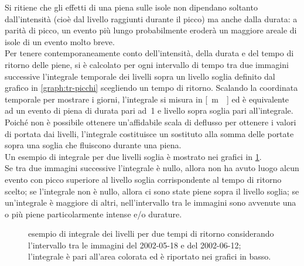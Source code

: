 Si ritiene che gli effetti di una piena sulle isole non dipendano soltanto dall'intensità (cioè dal livello raggiunti durante il picco) ma anche dalla durata: a parità di picco, un evento più lungo probabilmente eroderà un maggiore areale di isole di un evento molto breve.
\\
Per tenere contemporaneamente conto dell'intensità, della durata e del tempo di ritorno delle piene, si è calcolato per ogni intervallo di tempo tra due immagini successive l'integrale temporale dei livelli sopra un livello soglia definito dal grafico in \cref{graph:tr-picchi} scegliendo un tempo di ritorno.
Scalando la coordinata temporale per mostrare i giorni, l'integrale si misura in \si{[\m\giorno]} ed è equivalente ad un evento di piena di durata pari ad~\SI{1}{\giorno} e livello sopra soglia pari all'integrale.
Poiché non è possibile ottenere un'affidabile scala di deflusso per ottenere i valori di portata dai livelli, l'integrale costituisce un sostituto alla somma delle portate sopra una soglia che fluiscono durante una piena.
\\
Un esempio di integrale per due livelli soglia è mostrato nei grafici in \cref{graph:esempio-integrale-livelli}.
\\
Se tra due immagini successive l'integrale è nullo, allora non ha avuto luogo alcun evento con picco superiore al livello soglia corrispondente al tempo di ritorno scelto;
se l'integrale non è nullo, allora ci sono state piene sopra il livello soglia;
se un'integrale è maggiore di altri, nell'intervallo tra le immagini sono avvenute una o più piene particolarmente intense e/o durature.
%
\begin{figure}
	\centering
		
	\caption[esempio di integrale dei livelli]{esempio di integrale dei livelli per due tempi di ritorno considerando l'intervallo tra le immagini \AST{} del 2002-05-18 e del 2002-06-12; l'integrale è pari all'area colorata ed è riportato nei grafici in basso.}
	\label{graph:esempio-integrale-livelli}
\end{figure}
%

